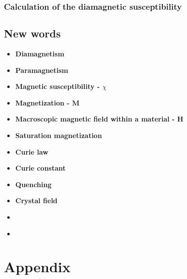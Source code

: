 \documentclass[11pt]{article}
\begin{document}
\subsubsection{Calculation of the diamagnetic susceptibility}

\subsection{New words}
\begin{itemize}
	\item \textbf{Diamagnetism}
	\item \textbf{Paramagnetism}
	\item \textbf{Magnetic susceptibility - $\chi$}
	\item \textbf{Magnetization - $\mathbf{M}$}
	\item \textbf{Macroscopic magnetic field within a material - $\mathbf{H}$}
	\item \textbf{Saturation magnetization}
	\item \textbf{Curie law}
	\item \textbf{Curie constant}
	\item \textbf{Quenching}
	\item \textbf{Crystal field}
	\item \textbf{}
	\item \textbf{}
\end{itemize}


\newpage
\begin{thebibliography}{9}
\end{thebibliography}
\clearpage
\appendix
\section{Appendix}
\end{document}
